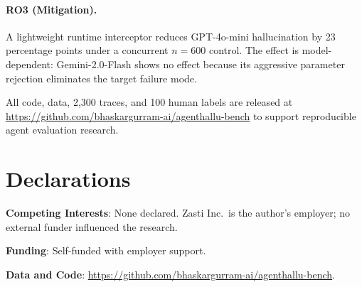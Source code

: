 \documentclass[preprint,review,12pt,3p]{elsarticle}
\begin{document}
\paragraph{RO3 (Mitigation).}
A lightweight runtime interceptor reduces GPT-4o-mini hallucination by
23 percentage points under a concurrent $n{=}600$ control.
The effect is model-dependent: Gemini-2.0-Flash shows no effect because
its aggressive parameter rejection eliminates the target failure mode.

All code, data, 2{,}300 traces, and 100 human labels are released at
\url{https://github.com/bhaskargurram-ai/agenthallu-bench} to support
reproducible agent evaluation research.


\section*{Declarations}

\textbf{Competing Interests}: None declared. Zasti Inc.\ is the
author's employer; no external funder influenced the research.

\textbf{Funding}: Self-funded with employer support.

\textbf{Data and Code}: \url{https://github.com/bhaskargurram-ai/agenthallu-bench}.




\end{document}
